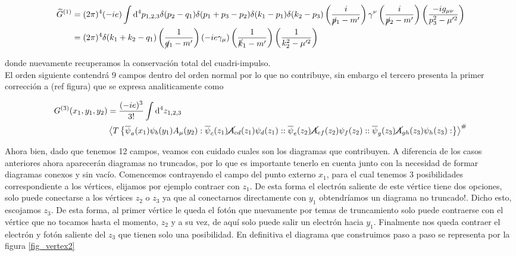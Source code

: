 \documentclass[tickz]{article}
\numberwithin{equation}{section}
\begin{document}
\begin{equation}\label{key}
\begin{aligned}
\widetilde{G}^{(1)}&= (2\pi)^4(-ie)\int \mathrm{d^4}p_{1,2,3} \delta(p_2-q_1)\delta(p_1+p_3-p_2) \delta(k_1-p_1)\delta(k_2-p_3) \left(\frac{i}{\cancel{p}_1 -m'}\right) \gamma^{\nu}\left(\frac{i}{\cancel{p}_2 -m'}\right) \left(\frac{-ig_{\mu\nu}}{p^2_3-\mu'^2}\right)\\
&=(2\pi)^4 \delta(k_1 +k_2 -q_1)  \left(\frac{1}{\cancel{q}_1 -m'}\right) \left(-ie\gamma_{\mu}\right)\left(\frac{1}{\cancel{k}_1 -m'}\right) \left(\frac{1}{k_2^2-\mu'^2}\right)
\end{aligned}
\end{equation}

donde nuevamente recuperamos la conservación total del cuadri-impulso.\\

El orden siguiente contendrá 9 campos dentro del orden normal por lo que no contribuye, sin embargo el tercero presenta la primer corrección a (ref figura) que se expresa analiticamente como

\begin{equation}\label{key}
\begin{aligned}
G^{(3)}(x_1,y_1,y_2)&=\frac{(-ie)^3}{3!}\int \mathrm{d^4}z_{1,2,3}\\
&\left\langle T\left\{ \overline{\psi}_a(x_1)\psi_b(y_1)A_{\mu}(y_2) :\overline{\psi}_c(z_{1})\cancel{A}_{cd}(z_{1})\psi_d(z_{1})::\overline{\psi}_e(z_2)\cancel{A}_{ef}(z_2)\psi_f(z_2)::\overline{\psi}_g(z_3)\cancel{A}_{gh}(z_3)\psi_h(z_3):\right\} \right\rangle ^{\#}
\end{aligned}
\end{equation}

Ahora bien, dado que tenemos 12 campos, veamos con cuidado cuales son los diagramas que contribuyen. A diferencia de los casos anteriores ahora aparecerán diagramas no truncados, por lo que es importante tenerlo en cuenta junto con la necesidad de formar diagramas conexos y sin vacío. Comencemos contrayendo el campo del punto externo $ x_1 $, para el cual tenemos 3 posibilidades correspondiente a los vértices, elijamos por ejemplo contraer con $ z_1 $. De esta forma el electrón saliente de este vértice tiene dos opciones, solo puede conectarse a los vértices $ z_2 $ o $ z_3 $ ya que al conectarnos directamente con $ y_1 $ obtendríamos un diagrama no truncado!. Dicho esto, escojamos $ z_3 $. De esta forma, al primer vértice le queda el fotón que nuevamente por temas de truncamiento solo puede contraerse con el vértice que no tocamos hasta el momento, $ z_2 $ y a su vez, de aquí solo puede salir un electrón hacia $ y_1 $. Finalmente nos queda contraer el electrón y fotón saliente del $ z_3 $ que tienen solo una posibilidad. En definitiva el diagrama que construimos paso a paso se representa por la figura \ref{fig_vertex2}
\end{document}

